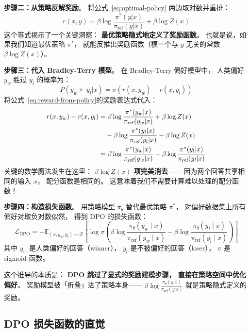 \textbf{步骤二：从策略反解奖励}。
将公式~\eqref{eq:optimal-policy} 两边取对数并重排：
\begin{equation}
  r(x,y) = \beta \log \frac{\pi^*(y|x)}{\pi_{\text{ref}}(y|x)} + \beta \log Z(x)
  \label{eq:reward-from-policy}
\end{equation}
这个等式揭示了一个关键洞察：
\textbf{最优策略隐式地定义了奖励函数}。
也就是说，如果我们知道最优策略 $\pi^*$，
就能反推出奖励函数（模一个与 $y$ 无关的常数 $\beta \log Z(x)$）。

\textbf{步骤三：代入 Bradley-Terry 模型}。
在 Bradley-Terry 偏好模型中，
人类偏好 $y_w$ 胜过 $y_l$ 的概率为：
\begin{equation}
  P(y_w \succ y_l | x) = \sigma\!\left(r(x, y_w) - r(x, y_l)\right)
\end{equation}
将公式~\eqref{eq:reward-from-policy}的奖励表达式代入：
\begin{align}
  r(x, y_w) - r(x, y_l)
  &= \beta \log \frac{\pi^*(y_w|x)}{\pi_{\text{ref}}(y_w|x)} + \beta \log Z(x) \notag \\
  &\quad - \beta \log \frac{\pi^*(y_l|x)}{\pi_{\text{ref}}(y_l|x)} - \beta \log Z(x) \notag \\
  &= \beta \log \frac{\pi^*(y_w|x)}{\pi_{\text{ref}}(y_w|x)}
     - \beta \log \frac{\pi^*(y_l|x)}{\pi_{\text{ref}}(y_l|x)}
\end{align}
关键的数学魔法发生在这里：
\textbf{$\beta \log Z(x)$ 项完美消去}——
因为两个回答共享相同的输入 $x$，
配分函数是相同的。
这意味着我们不需要计算难以处理的配分函数！

\textbf{步骤四：构造损失函数}。
用策略模型 $\pi_\theta$ 替代最优策略 $\pi^*$，
对偏好数据集上所有偏好对取负对数似然，
得到 DPO 的损失函数：
\begin{equation}
  \mathcal{L}_{\mathrm{DPO}} = -\mathbb{E}_{(x, y_w, y_l) \sim \mathcal{D}}\!\left[
    \log \sigma\!\left(
    \beta \log \frac{\pi_\theta(y_w \mid x)}{\pi_{\mathrm{ref}}(y_w \mid x)}
    - \beta \log \frac{\pi_\theta(y_l \mid x)}{\pi_{\mathrm{ref}}(y_l \mid x)}
  \right)\right]
  \label{eq:dpo}
\end{equation}
其中 $y_w$ 是人类偏好的回答（winner），
$y_l$ 是不被偏好的回答（loser），
$\sigma$ 是 sigmoid 函数。

这个推导的本质是：
\textbf{DPO 跳过了显式的奖励建模步骤，
直接在策略空间中优化偏好}。
奖励模型被「折叠」进了策略本身——
$\beta \log \frac{\pi_\theta(y|x)}{\pi_{\text{ref}}(y|x)}$
就是策略隐式定义的奖励。

\subsection{DPO 损失函数的直觉}

